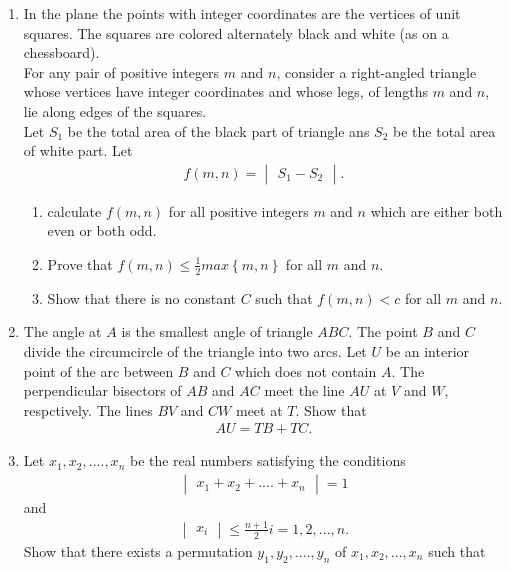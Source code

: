 \documentclass[12pt,-letter paper]{article}
\providecommand{\mydet}[1]{\ensuremath{\begin{vmatrix}#1\end{vmatrix}}}
\providecommand{\cbrak}[1]{\ensuremath{\left\{#1\right\}}}
\begin{document}
\begin{enumerate}
\item In the plane the points with integer coordinates are the vertices of unit squares. The squares are colored alternately black and white (as on a chessboard).\\                                                                                           For any pair of positive integers $m$ and $n$, consider a right-angled triangle whose vertices have integer coordinates and whose legs, of lengths $m$ and $n$, lie along edges of the squares.\\                                                             Let $S_1$ be the total area of the black part of triangle ans $S_2$ be the total area of white part. Let
\begin{align*}
f(m,n)=\mydet{S_1-S_2}.                                                             
\end{align*}                                                                        \begin{enumerate}                                                                   \item calculate $f(m,n)$ for all positive integers $m$ and $n$ which are either both even or both odd.
\item Prove that $f(m,n) \leq \frac{1}{2}max\cbrak{m,n}$ for all $m$ and $n$.
\item Show that there is no constant $C$ such that $f(m,n)<c$ for all $m$ and $n$.
\end{enumerate}
\item The angle at $A$ is the smallest angle of triangle $ABC$. The point $B$ and $C$ divide the circumcircle of the triangle into two arcs. Let $U$ be an interior point of the arc between $B$ and $C$ which does not contain $A$. The perpendicular bisectors of $AB$ and $AC$ meet the line $AU$ at $V$ and $W$, respctively. The lines $BV$ and $CW$ meet at $T$. Show that 
\begin{align*}
AU=TB+TC.
\end{align*}
\item Let $x_1,x_2,....,x_n$ be the real numbers satisfying the conditions 
\begin{align*}
\mydet{x_1+x_2+....+x_n}=1
\end{align*}
and
\begin{align*}
\mydet{x_i}\leq\frac{n+1}{2}      i=1,2,...,n.
\end{align*}
Show that there exists a permutation $y_1, y_2,....,y_n$ of $x_1, x_2,...,x_n$ such that

\end{enumerate}
\end{document}
